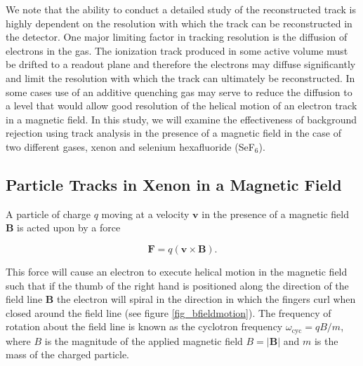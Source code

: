 \documentclass{JINST}
\begin{document}
We note that the ability to conduct a detailed study of the reconstructed track is highly dependent on the resolution
with which the track can be reconstructed in the detector.  One major limiting factor in tracking resolution is the diffusion
of electrons in the gas.  The ionization track produced in some active volume must be drifted to a readout plane and 
therefore the electrons may diffuse significantly and limit the resolution with which the track can ultimately be
reconstructed.  In some cases use of an additive quenching gas may serve to reduce the diffusion to a level that would 
allow good resolution of the helical motion of an electron track in a magnetic field.  In this study, we will examine the
effectiveness of background rejection using track analysis in the presence of a magnetic field in the case of two 
different gases, xenon and selenium hexafluoride (SeF$_6$).


\subsection{Particle Tracks in Xenon in a Magnetic Field}\label{ssec:magmotion}
A particle of charge $q$ moving at a velocity $\mathbf{v}$ in the presence of a magnetic field $\mathbf{B}$ is acted 
upon by a force

\begin{equation}\label{eqn_Bmotion}
\mathbf{F} = q(\mathbf{v} \times \mathbf{B}).
\end{equation}

This force will cause an electron to execute helical motion in the magnetic field such that if the thumb of the right hand is positioned along the direction of the field line $\mathbf{B}$ the electron will spiral in the direction in which the fingers curl when closed around the field line (see figure \ref{fig_bfieldmotion}).  The frequency of rotation about the field line is known as the cyclotron frequency $\omega_{\mathrm{cyc}} = qB/m$, where $B$ is the magnitude of the applied magnetic field $B = |\mathbf{B}|$ and $m$ is the mass of the charged particle.
\end{document}
